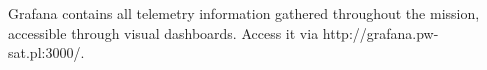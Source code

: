 
Grafana contains all telemetry information gathered throughout the mission, accessible through visual dashboards. Access it via http://grafana.pw-sat.pl:3000/.